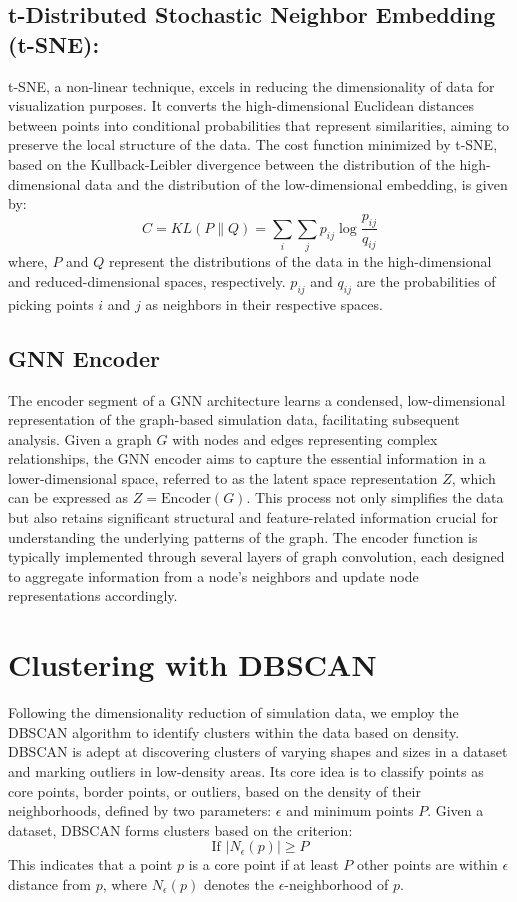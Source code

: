\subsection{t-Distributed Stochastic Neighbor Embedding (t-SNE):}
t-SNE, a non-linear technique, excels in reducing the dimensionality of data for visualization purposes. It converts the high-dimensional Euclidean distances between points into conditional probabilities that represent similarities, aiming to preserve the local structure of the data. The cost function minimized by t-SNE, based on the Kullback-Leibler divergence between the distribution of the high-dimensional data and the distribution of the low-dimensional embedding, is given by:
\begin{equation}
C = KL(P \parallel Q) = \sum_i \sum_j p_{ij} \log \frac{p_{ij}}{q_{ij}}
\end{equation}
where, $P$ and $Q$ represent the distributions of the data in the high-dimensional and reduced-dimensional spaces, respectively. $p_{ij}$ and $q_{ij}$ are the probabilities of picking points $i$ and $j$ as neighbors in their respective spaces.
\subsection{GNN Encoder}
The encoder segment of a GNN architecture learns a condensed, low-dimensional representation of the graph-based simulation data, facilitating subsequent analysis. Given a graph $G$ with nodes and edges representing complex relationships, the GNN encoder aims to capture the essential information in a lower-dimensional space, referred to as the latent space representation $Z$, which can be expressed as $Z = \text{Encoder}(G)$. This process not only simplifies the data but also retains significant structural and feature-related information crucial for understanding the underlying patterns of the graph.
The encoder function is typically implemented through several layers of graph convolution, each designed to aggregate information from a node's neighbors and update node representations accordingly.
\section{Clustering with DBSCAN}
Following the dimensionality reduction of simulation data, we employ the DBSCAN algorithm to identify clusters within the data based on density. DBSCAN is adept at discovering clusters of varying shapes and sizes in a dataset and marking outliers in low-density areas. Its core idea is to classify points as core points, border points, or outliers, based on the density of their neighborhoods, defined by two parameters: $\epsilon$ and minimum points $P$. Given a dataset, DBSCAN forms clusters based on the criterion:
\begin{equation}
\text{If } |N_\epsilon(p)| \geq P
\end{equation}
This indicates that a point $p$ is a core point if at least $P$ other points are within $\epsilon$ distance from $p$, where $N_\epsilon(p)$ denotes the $\epsilon$-neighborhood of $p$.
